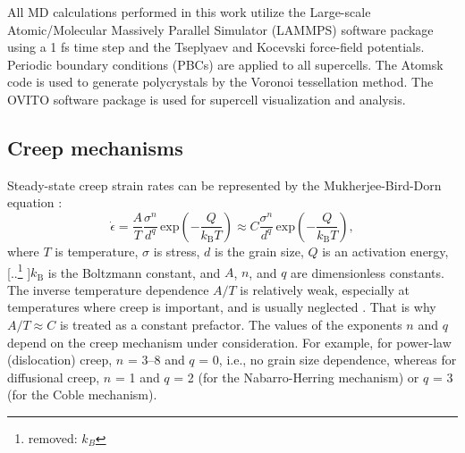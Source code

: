 \documentclass[preprint,12pt,sort&compress]{elsarticle} %
\newcommand{\?}{\stackrel{?}{=}}
\providecommand{\DIFaddtex}[1]{{\sf #1}} %
\providecommand{\DIFdeltex}[1]{{[..\footnote{removed: #1} ]}} %
\providecommand{\DIFaddbegin}{\protect\color{blue}} %
\providecommand{\DIFaddend}{\protect\color{black}} %
\providecommand{\DIFdelbegin}{\protect\color{red}} %
\providecommand{\DIFdelend}{\protect\color{black}} %
\providecommand{\DIFadd}[1]{\texorpdfstring{\DIFaddtex{#1}}{#1}} %
\providecommand{\DIFdel}[1]{\texorpdfstring{\DIFdeltex{#1}}{}} %
\newcommand{\DIFscaledelfig}{0.5}
\newlength{\DIFdelgraphicswidth} %
\newlength{\DIFdelgraphicsheight} %
\newcommand{\DIFaddincludegraphics}[2][]{{\color{blue}\fbox{\DIFOincludegraphics[#1]{#2}}}} %
\newcommand{\DIFdelincludegraphics}[2][]{%
\sbox{\DIFdelgraphicsbox}{\DIFOincludegraphics[#1]{#2}}%
\settoboxwidth{\DIFdelgraphicswidth}{\DIFdelgraphicsbox} %
\settoboxtotalheight{\DIFdelgraphicsheight}{\DIFdelgraphicsbox} %
\scalebox{\DIFscaledelfig}{%
\parbox[b]{\DIFdelgraphicswidth}{\usebox{\DIFdelgraphicsbox}\\[-\baselineskip] \rule{\DIFdelgraphicswidth}{0em}}\llap{\resizebox{\DIFdelgraphicswidth}{\DIFdelgraphicsheight}{%
\setlength{\unitlength}{\DIFdelgraphicswidth}%
\begin{picture}(1,1)%
\thicklines\linethickness{2pt} %
{\color[rgb]{1,0,0}\put(0,0){\framebox(1,1){}}}%
{\color[rgb]{1,0,0}\put(0,0){\line( 1,1){1}}}%
{\color[rgb]{1,0,0}\put(0,1){\line(1,-1){1}}}%
\end{picture}%
}\hspace*{3pt}}} %
} %
\DeclareRobustCommand{\DIFaddbegin}{\DIFOaddbegin \let\includegraphics\DIFaddincludegraphics} %
\DeclareRobustCommand{\DIFaddend}{\DIFOaddend \let\includegraphics\DIFOincludegraphics} %
\DeclareRobustCommand{\DIFdelbegin}{\DIFOdelbegin \let\includegraphics\DIFdelincludegraphics} %
\DeclareRobustCommand{\DIFdelend}{\DIFOaddend \let\includegraphics\DIFOincludegraphics} %
\begin{document}
All MD calculations performed in this work utilize the Large-scale Atomic/Molecular Massively Parallel Simulator (LAMMPS) software package \cite{Thompson2022} using a 1 fs time step and the Tseplyaev \cite{Tseplyaev2016} and Kocevski \cite{Kocevski2022II} force-field potentials. Periodic boundary conditions (PBCs) are applied to all supercells. The Atomsk code \cite{Hirel2015} is used to generate polycrystals by the Voronoi tessellation method. The OVITO software package \cite{Stukowski2010} is used for supercell visualization and analysis. 

\subsection{Creep mechanisms}

Steady-state creep strain rates can be represented by the Mukherjee-Bird-Dorn equation \cite{Mukherjee2002}: 
\DIFdelbegin %
\DIFdelend \DIFaddbegin \begin{equation}
\Dot{\epsilon} = \frac{A}{T} \frac{\sigma^n}{d^q} \, \mathrm{exp} \! \left( - \frac{Q}{k_\mathrm{B} T} \right) \approx C \frac{\sigma^n}{d^q} \, \mathrm{exp} \! \left( - \frac{Q}{k_\mathrm{B} T} \right),
\label{Eq:MBDEq}
\end{equation}\DIFaddend 
where $T$ is temperature, $\sigma$ is stress, $d$ is the grain size, $Q$ is an activation energy, \DIFdelbegin \DIFdel{$k_B$ }\DIFdelend \DIFaddbegin \DIFadd{$k_\mathrm{B}$ }\DIFaddend is the Boltzmann constant, and $A$, $n$, and $q$ are dimensionless constants. The inverse temperature dependence $A/T$ is relatively weak, especially at temperatures where creep is important, and is usually neglected \cite{Dowling2020}. That is why $A/T \approx C$ is treated as a constant prefactor. The values of the exponents $n$ and $q$ depend on the creep mechanism under consideration. For example, for power-law (dislocation) creep, $n$ = 3--8 and $q$ = 0, i.e., no grain size dependence, whereas for diffusional creep, $n$ = 1 and $q$ = 2 (for the Nabarro-Herring mechanism) or $q$ = 3 (for the Coble mechanism).
\end{document}
